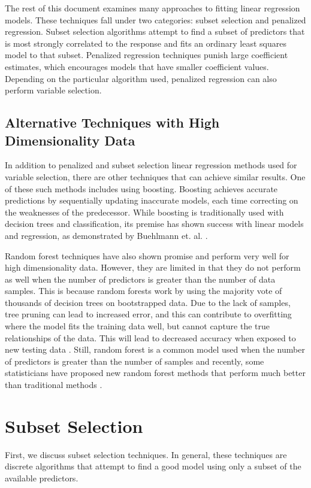 \documentclass{article}
\begin{document}
The rest of this document examines many approaches to fitting linear regression models. These techniques fall under two categories: subset selection and penalized regression. Subset selection algorithms attempt to find a subset of predictors that is most strongly correlated to the response and  fits an ordinary least squares model to that subset. Penalized regression techniques punish large coefficient estimates, which encourages models that have smaller coefficient values. Depending on the particular algorithm used, penalized regression can also perform variable selection.

\subsection{Alternative Techniques with High Dimensionality Data}
In addition to penalized and subset selection linear regression methods used for variable selection, there are other techniques that can achieve similar results. One of these such methods includes using boosting. Boosting achieves accurate predictions by sequentially updating inaccurate models, each time correcting on the weaknesses of the predecessor. While boosting is traditionally used with decision trees and classification, its premise has shown success with linear models and regression, as demonstrated by Buehlmann et. al. \cite{buehlmann2006boosting}.

Random forest techniques have also shown promise and perform very well for high dimensionality data. However, they are limited in that they do not perform as well when the number of predictors is greater than the number of data samples. This is because random forests work by using the majority vote of thousands of decision trees on bootstrapped data. Due to the lack of samples, tree pruning can lead to increased error, and this can contribute to overfitting where the model fits the training data well, but cannot capture the true relationships of the data. This will lead to decreased accuracy when exposed to new testing data \cite{genuer2008random}. Still, random forest is a common model used when the number of predictors is greater than the number of samples and recently, some statisticians have proposed new random forest methods that perform much better than traditional methods \cite{capitaine2021random}.

\section{Subset Selection}
First, we discuss subset selection techniques. In general, these techniques are discrete algorithms that attempt to find a good model using only a subset of the available predictors.
\end{document}
